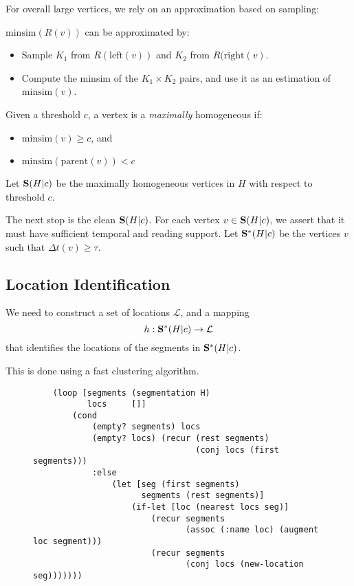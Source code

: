 For overall large vertices, we rely on an approximation based on sampling:

$\mathrm{minsim}(R(v))$ can be approximated by:
\begin{itemize}
    \item Sample $K_1$ from $R(\mathrm{left}(v))$ and $K_2$ from
        $R(\mathrm{right}(v)$.
    \item Compute the minsim of the $K_1\times K_2$ pairs, and use it as an
        estimation of $\mathrm{minsim}(v)$.
\end{itemize}

\begin{definition}[Segmentation]
    Given a threshold $c$, a vertex is a {\em maximally} homogeneous if:
    \begin{itemize}
        \item $\mathrm{minsim}(v) \geq c$, and
        \item $\mathrm{minsim}(\mathrm{parent}(v)) < c$
    \end{itemize}
\end{definition}

Let $\mathbf{S}(H|c)$ be the maximally homogeneous vertices in $H$ with respect to
threshold $c$.

The next stop is the clean $\mathbf{S}(H|c)$.  For each vertex
$v\in\mathbf{S}(H|c)$, we assert that it must have sufficient temporal and
reading support.  Let $\mathbf{S}^*(H|c)$ be the vertices $v$ such
that $\Delta t(v)\geq \tau$.

\subsection{Location Identification}

We need to construct a set of locations $\mathcal{L}$, and a mapping
$$h:\mathbf{S}^*(H|c)\to \mathcal{L}$$
that identifies the locations of the segments in $\mathbf{S}^*(H|c)$.

This is done using a fast clustering algorithm.

\begin{figure*}
    \begin{verbatim}
    (loop [segments (segmentation H)
           locs     []]
        (cond
            (empty? segments) locs
            (empty? locs) (recur (rest segments)
                                 (conj locs (first segments)))
            :else
                (let [seg (first segments)
                      segments (rest segments)]
                    (if-let [loc (nearest locs seg)]
                        (recur segments
                               (assoc (:name loc) (augment loc segment)))
                        (recur segments
                               (conj locs (new-location seg)))))))
    \end{verbatim}
\end{figure*}

